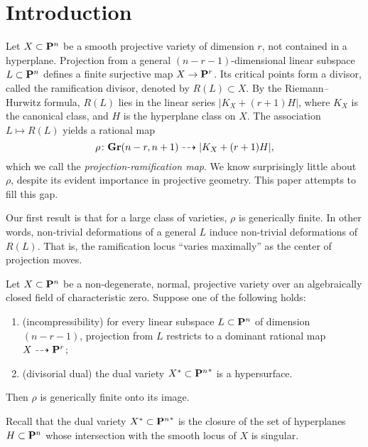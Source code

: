 \section{Introduction}\label{sec:intro}
Let $X \subset \P^n$ be a smooth projective variety of dimension $r$, not contained in a hyperplane.
Projection from a general $(n-r-1)$-dimensional linear subspace $L \subset \P^n$ defines a finite surjective map $X \to \P^r$.
Its critical points form a divisor, called the ramification divisor, denoted by $R(L) \subset X$.
By the Riemann--Hurwitz formula, $R(L)$ lies in the linear series $|K_X + (r+1)H|$, where $K_X$ is the canonical class, and $H$ is the hyperplane class on $X$.
The association $L \mapsto R(L)$ yields a rational map 
\[
  \rho \from \Gr(n-r, n+1) \dashrightarrow |K_X + (r+1)H|,
\]
which we call the \emph{projection-ramification map}.
We know surprisingly little about $\rho$, despite its evident importance in projective geometry.
This paper attempts to fill this gap.

Our first result is that for a large class of varieties, $\rho$ is generically finite.
In other words, non-trivial deformations of a general $L$ induce non-trivial deformations of $R(L)$.
That is, the ramification locus ``varies maximally'' as the center of projection moves.
\begin{maintheorem}\label{thm:main}
  Let $X \subset \P^n$ be a non-degenerate, normal, projective variety over an algebraically closed field of characteristic zero.
  Suppose one of the following holds:
  \begin{enumerate}
  \item\label{item:incomp}(incompressibility) for every linear subspace $L \subset \P^n$ of dimension $(n-r-1)$, projection from $L$ restricts to a dominant rational map $X \dashrightarrow \P^r$;
  \item\label{item:dual}(divisorial dual) the dual variety $X^* \subset {\P^n}^*$ is a hypersurface.
  \end{enumerate}
  Then $\rho$ is generically finite onto its image.
\end{maintheorem}
Recall that the dual variety $X^* \subset {\P^n}^*$ is the closure of the set of hyperplanes $H \subset \P^n$ whose intersection with the smooth locus of $X$ is singular.

